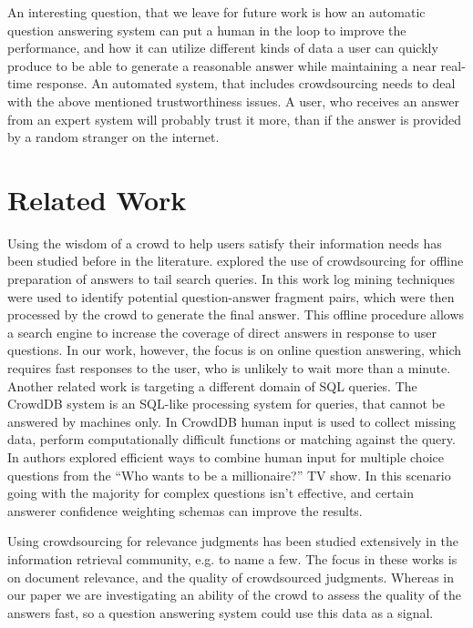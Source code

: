 \documentclass[11pt,letterpaper]{article}
\begin{document}
An interesting question, that we leave for future work is how an automatic question answering system can put a human in the loop to improve the performance, and how it can utilize different kinds of data a user can quickly produce to be able to generate a reasonable answer while maintaining a near real-time response.
An automated system, that includes crowdsourcing needs to deal with the above mentioned trustworthiness issues.
A user, who receives an answer from an expert system will probably trust it more, than if the answer is provided by a random stranger on the internet.


\section{Related Work}
\label{sec:related_work}

Using the wisdom of a crowd to help users satisfy their information needs has been studied before in the literature.
\cite{bernstein2012direct} explored the use of crowdsourcing for offline preparation of answers to tail search queries.
In this work log mining techniques were used to identify potential question-answer fragment pairs, which were then processed by the crowd to generate the final answer.
This offline procedure allows a search engine to increase the coverage of direct answers in response to user questions.
In our work, however, the focus is on online question answering, which requires fast responses to the user, who is unlikely to wait more than a minute.
Another related work is targeting a different domain of SQL queries.
The CrowdDB system \cite{franklin2011crowddb} is an SQL-like processing system for queries, that cannot be answered by machines only.
In CrowdDB human input is used to collect missing data, perform computationally difficult functions or matching against the query.
In \cite{aydin2014crowdsourcing} authors explored efficient ways to combine human input for multiple choice questions from the ``Who wants to be a millionaire?'' TV show.
In this scenario going with the majority for complex questions isn't effective, and certain answerer confidence weighting schemas can improve the results.  

Using crowdsourcing for relevance judgments has been studied extensively in the information retrieval community, e.g. \cite{Alonso:2008:CRE:1480506.1480508,alonso2011design,grady2010crowdsourcing} to name a few.
The focus in these works is on document relevance, and the quality of crowdsourced judgments.
Whereas in our paper we are investigating an ability of the crowd to assess the quality of the answers fast, so a question answering system could use this data as a signal.
\end{document}
